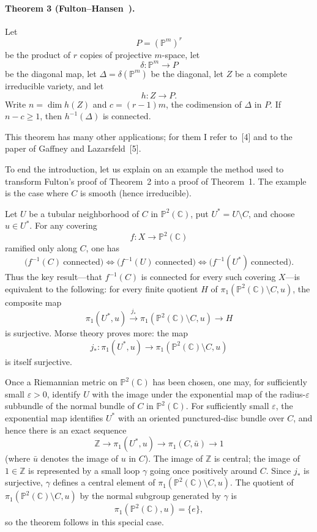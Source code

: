 \documentclass[11pt]{amsart}
\newcommand{\PP}{\mathbb{P}}
\newcommand{\CC}{\mathbb{C}}
\newcommand{\ZZ}{\mathbb{Z}}
\newcommand{\DeltaDiag}{\Delta}
\begin{document}
\paragraph{\textbf{Theorem 3 (Fulton--Hansen~\cite{FultonHansen1979}).}}
Let
\[
P=(\PP^m)^r
\]
be the product of $r$ copies of projective $m$-space, let
\[
\delta\colon \PP^m\to P
\]
be the diagonal map, let $\DeltaDiag=\delta(\PP^m)$ be the diagonal, let $Z$ be a complete irreducible variety, and let
\[
h\colon Z\to P.
\]
Write $n=\dim h(Z)$ and $c=(r-1)m$, the codimension of $\DeltaDiag$ in $P$. If $n-c\ge 1$, then $h^{-1}(\DeltaDiag)$ is connected.

This theorem has many other applications; for them I refer to~[4] and to the paper of Gaffney and Lazarsfeld~[5].

To end the introduction, let us explain on an example the method used to transform Fulton's proof of Theorem~2 into a proof of Theorem~1. The example is the case where $C$ is smooth (hence irreducible).

Let $U$ be a tubular neighborhood of $C$ in $\PP^2(\CC)$, put $U^*=U\setminus C$, and choose $u\in U^*$. For any covering
\[
f\colon X\to \PP^2(\CC)
\]
ramified only along $C$, one has
\[
\bigl(f^{-1}(C)\ \text{connected}\bigr)\Longleftrightarrow \bigl(f^{-1}(U)\ \text{connected}\bigr)\Longleftrightarrow \bigl(f^{-1}(U^*)\ \text{connected}\bigr).
\]
Thus the key result---that $f^{-1}(C)$ is connected for every such covering $X$---is equivalent to the following: for every finite quotient $H$ of $\pi_1(\PP^2(\CC)\setminus C,u)$, the composite map
\[
\pi_1(U^*,u)\xrightarrow{j_*}\pi_1(\PP^2(\CC)\setminus C,u)\to H
\]
is surjective. Morse theory proves more: the map
\[
j_*\colon \pi_1(U^*,u)\to \pi_1(\PP^2(\CC)\setminus C,u)
\]
is itself surjective.

Once a Riemannian metric on $\PP^2(\CC)$ has been chosen, one may, for sufficiently small $\varepsilon>0$, identify $U$ with the image under the exponential map of the radius-$\varepsilon$ subbundle of the normal bundle of $C$ in $\PP^2(\CC)$. For sufficiently small $\varepsilon$, the exponential map identifies $U^*$ with an oriented punctured-disc bundle over $C$, and hence there is an exact sequence
\[
\ZZ\to \pi_1(U^*,u)\to \pi_1(C,\bar u)\to 1
\]
(where $\bar u$ denotes the image of $u$ in $C$). The image of $\ZZ$ is central; the image of $1\in \ZZ$ is represented by a small loop $\gamma$ going once positively around $C$. Since $j_*$ is surjective, $\gamma$ defines a central element of $\pi_1(\PP^2(\CC)\setminus C,u)$. The quotient of $\pi_1(\PP^2(\CC)\setminus C,u)$ by the normal subgroup generated by $\gamma$ is
\[
\pi_1(\PP^2(\CC),u)=\{e\},
\]
so the theorem follows in this special case.
\end{document}
